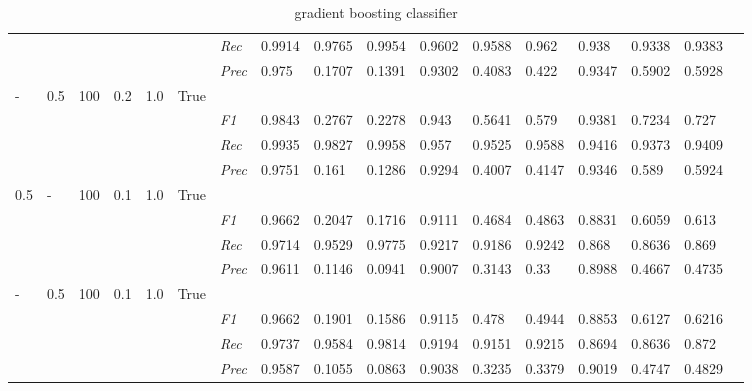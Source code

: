 \begin{table}[]
\begin{tabularx}{\textwidth}{XXXXXX|X|XXX|XXX|XXXX}
    & & & & & & \textit{Rec} & 0.9914 & 0.9765 & 0.9954    & 0.9602 & 0.9588    & 0.962    & 0.938    & 0.9338    & 0.9383    \\
    & & & & & & \textit{Prec} & 0.975 & 0.1707 & 0.1391 & 0.9302 & 0.4083 & 0.422 & 0.9347 & 0.5902 & 0.5928 \\ \midrule
    - & 0.5 & 100 & 0.2 & 1.0 &True & & & & & & & & & \\
    & & & & & & \textit{F1} & 0.9843 & 0.2767 & 0.2278 & 0.943 & 0.5641        & 0.579        & 0.9381        & 0.7234        & 0.727        \\
    & & & & & & \textit{Rec} & 0.9935 & 0.9827 & 0.9958    & 0.957 & 0.9525    & 0.9588    & 0.9416    & 0.9373    & 0.9409    \\
    & & & & & & \textit{Prec} & 0.9751 & 0.161 & 0.1286 & 0.9294 & 0.4007 & 0.4147 & 0.9346 & 0.589 & 0.5924 \\ \midrule
    0.5 & - & 100 & 0.1 & 1.0 &True & & & & & & & & & \\
    & & & & & & \textit{F1} & 0.9662 & 0.2047 & 0.1716 & 0.9111 & 0.4684        & 0.4863        & 0.8831        & 0.6059        & 0.613        \\
    & & & & & & \textit{Rec} & 0.9714 & 0.9529 & 0.9775    & 0.9217 & 0.9186    & 0.9242    & 0.868    & 0.8636    & 0.869    \\
    & & & & & & \textit{Prec} & 0.9611 & 0.1146 & 0.0941 & 0.9007 & 0.3143 & 0.33 & 0.8988 & 0.4667 & 0.4735 \\ \midrule
    - & 0.5 & 100 & 0.1 & 1.0 &True & & & & & & & & & \\
    & & & & & & \textit{F1} & 0.9662 & 0.1901 & 0.1586 & 0.9115 & 0.478        & 0.4944        & 0.8853        & 0.6127        & 0.6216        \\
    & & & & & & \textit{Rec} & 0.9737 & 0.9584 & 0.9814    & 0.9194 & 0.9151    & 0.9215    & 0.8694    & 0.8636    & 0.872    \\
    & & & & & & \textit{Prec} & 0.9587 & 0.1055 & 0.0863 & 0.9038 & 0.3235 & 0.3379 & 0.9019 & 0.4747 & 0.4829 \\ \midrule
    \end{tabularx}
    \caption{gradient boosting classifier}
    \label{tab:all_results_gradient_boosting_classifier}
    \end{table}
    
